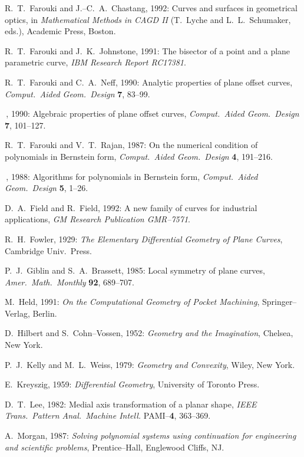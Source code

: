 \begin{thebibliography}{99}
R.~T.~Farouki and J.--C.~A.~Chastang, 1992: Curves and surfaces
in geometrical optics, in {\it Mathematical Methods in CAGD II\/}
(T.~Lyche and L.~L.~Schumaker, eds.), Academic Press, Boston.

R.~T.~Farouki and J.~K.~Johnstone, 1991: The bisector of a point and
a plane parametric curve, {\it IBM Research Report RC17381}.

R.~T.~Farouki and C.~A.~Neff, 1990: Analytic properties of plane
offset curves, {\it Comput.\ Aided Geom.\ Design\/} {\bf 7}, 83--99.

\ldash\,, 1990: Algebraic properties of plane offset curves,
{\it Comput.\ Aided Geom.\ Design\/} {\bf 7}, 101--127.

R.~T.~Farouki and V.~T.~Rajan, 1987: On the numerical condition of
polynomials in Bernstein form, {\it Comput.\ Aided Geom.\ Design\/}
{\bf 4}, 191--216.

\ldash\,, 1988: Algorithms for polynomials in Bernstein form,
{\it Comput.\ Aided Geom.\ Design\/} {\bf 5}, 1--26.

D.~A.~Field and R.~Field, 1992: A new family of curves for industrial
applications, {\it GM Research Publication GMR--7571}.

R.~H.~Fowler, 1929: {\it The Elementary Differential Geometry of
Plane Curves}, Cambridge Univ.\ Press.

P.~J.~Giblin and S.~A.~Brassett, 1985: Local symmetry of plane curves,
{\it Amer.\ Math.\ Monthly\/} {\bf 92}, 689--707.

M.~Held, 1991: {\it On the Computational Geometry of Pocket Machining},
Springer--Verlag, Berlin.

D.~Hilbert and S.~Cohn--Vossen, 1952: {\it Geometry and the Imagination},
Chelsea, New York.

P.~J.~Kelly and M.~L.~Weiss, 1979: {\it Geometry and Convexity}, Wiley,
New York.

E.~Kreyszig, 1959: {\it Differential Geometry}, University of Toronto
Press.

D.~T.~Lee, 1982: Medial axis transformation of a planar shape, {\it IEEE
Trans.\ Pattern Anal.\ Machine Intell.} PAMI--{\bf 4}, 363--369.

A.~Morgan, 1987: {\it Solving polynomial systems using continuation
for engineering and scientific problems}, Prentice--Hall, Englewood
Cliffs, NJ.


\end{thebibliography}
